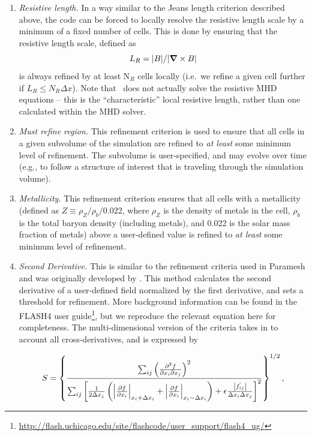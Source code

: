 \begin{enumerate}
\item{\em Resistive length.}  In a way similar to the Jeans length criterion described above, the code can be forced to locally resolve the resistive length scale by a minimum of a fixed number of cells.  This is done by ensuring that the resistive length scale, defined as
\begin{equation}
L_R = |B| / |\curl B|
\end{equation}
is always refined by at least N$_R$ cells locally (i.e.~we refine a given cell further if $L_R \leq N_R \Delta x$).  Note that \enzo\ does not actually solve the resistive MHD equations -- this is the ``characteristic'' local resistive length, rather than one calculated within the MHD solver.

\item{\em Must refine region.}  This refinement criterion is used to ensure that all cells in a given subvolume of the simulation are refined to {\it at least} some minimum level of refinement.  The subvolume is user-specified, and may evolve over time (e.g., to follow a structure of interest that is traveling through the simulation volume).

\item{\em Metallicity.}  This refinement criterion ensures that all cells with a metallicity (defined as $Z \equiv \rho_{Z} / \rho_{b} / 0.022$, where $\rho_{Z}$ is the density of metals in the cell, $\rho_{b}$ is the total baryon density (including metals), and 0.022 is the solar mass fraction of metals) above a user-defined value is refined to {\it at least} some minimum level of refinement. 

\item{\em Second Derivative.}  This is similar to the refinement criteria used
  in Paramesh and was originally developed by \cite{1987nasa.reptQ....L}.  This
  method calculates the second derivative of a user-defined field normalized by
  the first derivative, and sets a threshold for refinement.  More background
  information can be found in the FLASH4 user guide\footnote{\url{http://flash.uchicago.edu/site/flashcode/user\_support/flash4\_ug/}},
  but we reproduce the relevant equation here for completeness. The
  multi-dimensional version of the criteria takes in to account all
  cross-derivatives, and is expressed by

 \begin{equation}
   S = \left\{ \frac{\sum_{ij}\left( \frac{\partial^2f}{\partial x_i \partial x_j} \right)^2}{\sum_{ij}\left[ \frac{1}{2\Delta x_j}\left( \abs{\frac{\partial f}{\partial x_i}}_{x_i+\Delta x_i} + \abs{\frac{\partial f}{\partial x_i}}_{x_i-\Delta x_i} \right) + \epsilon \frac{\abs{\bar{f_{ij}}}}{\Delta x_i \Delta x_j} \right]^2} \right\}^{1/2},
   \label{eq:second-deriv_analytical}
 \end{equation}


\end{enumerate}

